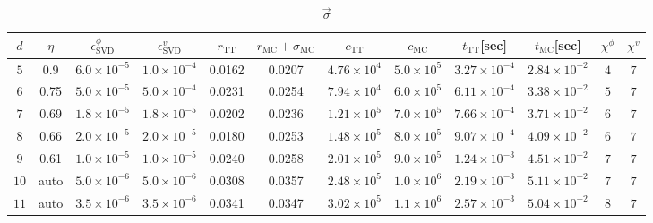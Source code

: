 \begin{table*}[htbp]
\begin{subtable}[h]{0.9\textwidth}
\centering
\caption{$\vec{\sigma}$}
\begin{tabular}{|c|c|c|c|c|c|c|c|c|c|c|c|}
    \hline
    $d$ & $\eta$ & $\epsilon_{\mathrm{SVD}}^\phi$ & $\epsilon_{\mathrm{SVD}}^v$ & $r_{\mathrm{TT}}$ & $r_{\mathrm{MC}} + \sigma_{\text{MC}}$ & {$c_{\mathrm{TT}}$} & {$c_{\mathrm{MC}}$} & {$t_{\mathrm{TT}}$[sec]} & {$t_{\mathrm{MC}}$[sec]} & {$\chi^{\phi}_{\mathrm{}}$} &
    {$\chi^{v}_{\mathrm{}}$} \\
    \hline
    $5$ & 0.9 & $6.0 \times 10^{-5}$ & $1.0 \times 10^{-4}$ & 0.0162 & 0.0207 & $4.76 \times 10^4$ & $5.0 \times 10^5$ & $3.27 \times 10^{-4}$ & $2.84 \times 10^{-2}$ & $4$ & $7$\\
    \hline
    $6$ & 0.75 & $5.0 \times 10^{-5}$ & $5.0 \times 10^{-4}$ & 0.0231 & 0.0254 & $7.94 \times 10^4$ & $6.0 \times 10^5$ & $6.11 \times 10^{-4}$ & $3.38 \times 10^{-2}$ & $5$ & $7$\\
    \hline
    $7$ & 0.69 & $1.8 \times 10^{-5}$ & $1.8 \times 10^{-5}$ & 0.0202 & 0.0236 & $1.21 \times 10^5$ & $7.0 \times 10^5$ & $7.66 \times 10^{-4}$ & $3.71 \times 10^{-2}$ & $6$ & $7$\\
    \hline
    $8$ & 0.66 & $2.0 \times 10^{-5}$ & $2.0 \times 10^{-5}$ & 0.0180 & 0.0253 & $1.48 \times 10^5$ & $8.0 \times 10^5$ & $9.07 \times 10^{-4}$ & $4.09 \times 10^{-2}$ &
    $6$ & $7$\\
    \hline
    $9$ & 0.61 & $1.0 \times 10^{-5}$ & $1.0 \times 10^{-5}$ & 0.0240 & 0.0258 & $2.01 \times 10^5$ & $9.0 \times 10^5$ & $1.24 \times 10^{-3}$ & $4.51 \times 10^{-2}$ &
    $7$ & $7$\\
    \hline
    $10$ & auto & $5.0 \times 10^{-6}$ & $5.0 \times 10^{-6}$ & 0.0308 & 0.0357 & $2.48 \times 10^5$ & $1.0 \times 10^6$ & $2.19 \times 10^{-3}$ & $5.11 \times 10^{-2}$ &
    $7$ & $7$\\
    \hline
    $11$ & auto & $3.5 \times 10^{-6}$ & $3.5 \times 10^{-6}$ & 0.0341 & 0.0347 & $3.02 \times 10^5$ & $1.1 \times 10^6$ & $2.57 \times 10^{-3}$ & $5.04 \times 10^{-2}$ &
    $8$ & $7$
    \\
    \hline
\end{tabular}
\end{subtable}
\
\vspace{10pt}    



\end{table*}
